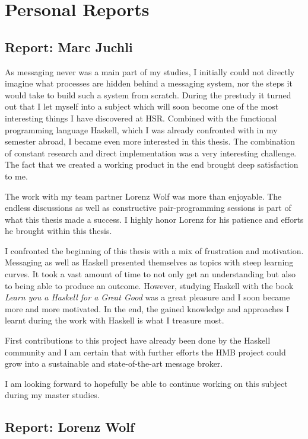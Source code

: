 \chapter{Personal Reports}

\section*{Report: Marc Juchli}

As messaging never was a main part of my studies, I initially could not
directly imagine what processes are hidden behind a messaging system, nor the
steps it would take to build such a system from scratch.  During the prestudy it
turned out that I let myself into a subject which will soon become one of the
most interesting things I have discovered at HSR. Combined with the functional
programming language Haskell, which I was already confronted with in my semester
abroad, I became even more interested in this thesis. The combination of
constant research and direct implementation was a very interesting challenge.
The fact that we created a working product in the end brought deep satisfaction
to me.

The work with my team partner Lorenz Wolf was more than enjoyable. The endless
discussions as well as constructive pair-programming sessions is part of what
this thesis made a success. I highly honor Lorenz for his patience and efforts
he brought within this thesis.

I confronted the beginning of this thesis with a mix of frustration and
motivation. Messaging as well as Haskell presented themselves as topics with
steep learning curves. It took a vast amount of time to not only get an
understanding but also to being able to produce an outcome.  However, studying
Haskell with the book \textit{Learn you a Haskell for a Great Good} was a great
pleasure and I soon became more and more motivated.  In the end, the gained
knowledge and approaches I learnt during the work with Haskell is what I
treasure most.

First contributions to this project have already been done by the Haskell
community and I am certain that with further efforts the HMB project could grow
into a sustainable and state-of-the-art message broker.

I am looking forward to hopefully be able to continue working on this subject
during my master studies.

\newpage
\section*{Report: Lorenz Wolf}

